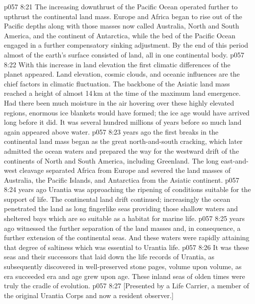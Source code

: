 \vs p057 8:21 The increasing downthrust of the Pacific Ocean operated further to upthrust the continental land mass. Europe and Africa began to rise out of the Pacific depths along with those masses now called Australia, North and South America, and the continent of Antarctica, while the bed of the Pacific Ocean engaged in a further compensatory sinking adjustment. By the end of this period almost  of the earth’s surface consisted of land, all in one continental body.
\vs p057 8:22 With this increase in land elevation the first climatic differences of the planet appeared. Land elevation, cosmic clouds, and oceanic influences are the chief factors in climatic fluctuation. The backbone of the Asiatic land mass reached a height of almost 14\,km at the time of the maximum land emergence. Had there been much moisture in the air hovering over these highly elevated regions, enormous ice blankets would have formed; the ice age would have arrived long before it did. It was several hundred millions of years before so much land again appeared above water.
\vs p057 8:23 \pc {} years ago the first breaks in the continental land mass began as the great north\hyp{}and\hyp{}south cracking, which later admitted the ocean waters and prepared the way for the westward drift of the continents of North and South America, including Greenland. The long east\hyp{}and\hyp{}west cleavage separated Africa from Europe and severed the land masses of Australia, the Pacific Islands, and Antarctica from the Asiatic continent.
\vs p057 8:24 \pc {} years ago Urantia was approaching the ripening of conditions suitable for the support of life. The continental land drift continued; increasingly the ocean penetrated the land as long fingerlike seas providing those shallow waters and sheltered bays which are so suitable as a habitat for marine life.
\vs p057 8:25 \pc {} years ago witnessed the further separation of the land masses and, in consequence, a further extension of the continental seas. And these waters were rapidly attaining that degree of saltiness which was essential to Urantia life.
\vs p057 8:26 It was these seas and their successors that laid down the life records of Urantia, as subsequently discovered in well\hyp{}preserved stone pages, volume upon volume, as era succeeded era and age grew upon age. These inland seas of olden times were truly the cradle of evolution.
\vsetoff
\vs p057 8:27 [Presented by a Life Carrier, a member of the original Urantia Corps and now a resident observer.]
\quizlink
{}
